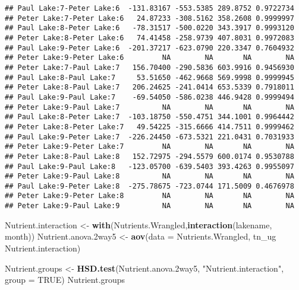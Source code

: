 \documentclass[]{article}
\newenvironment{Shaded}{\begin{snugshade}}{\end{snugshade}}
\newcommand{\DataTypeTok}[1]{\textcolor[rgb]{0.13,0.29,0.53}{#1}}
\newcommand{\FloatTok}[1]{\textcolor[rgb]{0.00,0.00,0.81}{#1}}
\newcommand{\KeywordTok}[1]{\textcolor[rgb]{0.13,0.29,0.53}{\textbf{#1}}}
\newcommand{\NormalTok}[1]{#1}
\newcommand{\OperatorTok}[1]{\textcolor[rgb]{0.81,0.36,0.00}{\textbf{#1}}}
\newcommand{\OtherTok}[1]{\textcolor[rgb]{0.56,0.35,0.01}{#1}}
\newcommand{\StringTok}[1]{\textcolor[rgb]{0.31,0.60,0.02}{#1}}
\begin{document}
\begin{verbatim}
## Paul Lake:7-Peter Lake:6  -131.83167 -553.5385 289.8752 0.9722734
## Peter Lake:7-Peter Lake:6   24.87233 -308.5162 358.2608 0.9999997
## Paul Lake:8-Peter Lake:6   -78.31517 -500.0220 343.3917 0.9993120
## Peter Lake:8-Peter Lake:6   74.41458 -258.9739 407.8031 0.9972083
## Paul Lake:9-Peter Lake:6  -201.37217 -623.0790 220.3347 0.7604932
## Peter Lake:9-Peter Lake:6         NA        NA       NA        NA
## Peter Lake:7-Paul Lake:7   156.70400 -290.5836 603.9916 0.9456930
## Paul Lake:8-Paul Lake:7     53.51650 -462.9668 569.9998 0.9999945
## Peter Lake:8-Paul Lake:7   206.24625 -241.0414 653.5339 0.7918011
## Paul Lake:9-Paul Lake:7    -69.54050 -586.0238 446.9428 0.9999494
## Peter Lake:9-Paul Lake:7          NA        NA       NA        NA
## Paul Lake:8-Peter Lake:7  -103.18750 -550.4751 344.1001 0.9964442
## Peter Lake:8-Peter Lake:7   49.54225 -315.6666 414.7511 0.9999462
## Paul Lake:9-Peter Lake:7  -226.24450 -673.5321 221.0431 0.7031933
## Peter Lake:9-Peter Lake:7         NA        NA       NA        NA
## Peter Lake:8-Paul Lake:8   152.72975 -294.5579 600.0174 0.9530788
## Paul Lake:9-Paul Lake:8   -123.05700 -639.5403 393.4263 0.9955097
## Peter Lake:9-Paul Lake:8          NA        NA       NA        NA
## Paul Lake:9-Peter Lake:8  -275.78675 -723.0744 171.5009 0.4676978
## Peter Lake:9-Peter Lake:8         NA        NA       NA        NA
## Peter Lake:9-Paul Lake:9          NA        NA       NA        NA
\end{verbatim}

\begin{Shaded}
\begin{Highlighting}[]
\NormalTok{Nutrient.interaction <-}\StringTok{ }\KeywordTok{with}\NormalTok{(Nutrients.Wrangled,}\KeywordTok{interaction}\NormalTok{(lakename, month))}
\NormalTok{Nutrient.anova}\FloatTok{.2}\NormalTok{way5 <-}\StringTok{ }\KeywordTok{aov}\NormalTok{(}\DataTypeTok{data =}\NormalTok{ Nutrients.Wrangled, tn_ug }\OperatorTok{~}\StringTok{ }\NormalTok{Nutrient.interaction)}

\NormalTok{Nutrient.groups <-}\StringTok{ }\KeywordTok{HSD.test}\NormalTok{(Nutrient.anova}\FloatTok{.2}\NormalTok{way5, }\StringTok{"Nutrient.interaction"}\NormalTok{, }\DataTypeTok{group =} \OtherTok{TRUE}\NormalTok{)}
\NormalTok{Nutrient.groups}
\end{Highlighting}
\end{Shaded}
\end{document}
